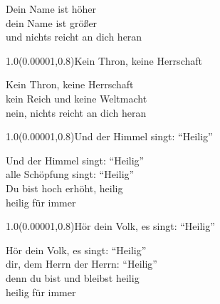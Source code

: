 \documentclass[aspectratio=169]{beamer}
\begin{document}
\begin{frame}
\centering
\color{white}
\huge{Dein Name ist höher} \\
\huge{dein Name ist größer} \\
\huge{und nichts reicht an dich heran} \\

\begin{textblock}{1.0}(0.00001,0.8)\color{gray}\normalsize{Kein Thron, keine Herrschaft}\end{textblock}
\end{frame}

\begin{frame}
\centering
\color{white}
\huge{Kein Thron, keine Herrschaft} \\
\huge{kein Reich und keine Weltmacht} \\
\huge{nein, nichts reicht an dich heran} \\

\begin{textblock}{1.0}(0.00001,0.8)\color{gray}\normalsize{Und der Himmel singt: “Heilig”}\end{textblock}
\end{frame}

\begin{frame}
\centering
\color{white}
\huge{Und der Himmel singt: “Heilig”} \\
\huge{alle Schöpfung singt: “Heilig”} \\
\huge{Du bist hoch erhöht, heilig} \\
\huge{heilig für immer} \\

\begin{textblock}{1.0}(0.00001,0.8)\color{gray}\normalsize{Hör dein Volk, es singt: “Heilig”}\end{textblock}
\end{frame}

\begin{frame}
\centering
\color{white}
\huge{Hör dein Volk, es singt: “Heilig”} \\
\huge{dir, dem Herrn der Herrn: “Heilig”} \\
\huge{denn du bist und bleibst heilig} \\
\huge{heilig für immer} \\
\end{frame}
\end{document}
